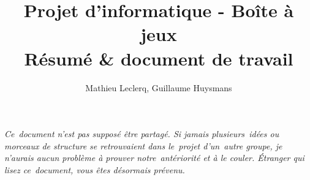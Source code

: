 \documentclass[12pt]{article}
\title{Projet d'informatique - Boîte à jeux\\Résumé \& document de travail}
\author{Mathieu Leclerq, Guillaume Huysmans}
\begin{document}
\maketitle


\textit{Ce~document n'est pas supposé être partagé. Si jamais plusieurs~idées ou morceaux de structure se retrouvaient dans le~projet d'un~autre groupe, je n'aurais aucun problème à prouver notre~antériorité et à le couler. Étranger qui lisez ce~document, vous êtes désormais prévenu.}








\end{document}
